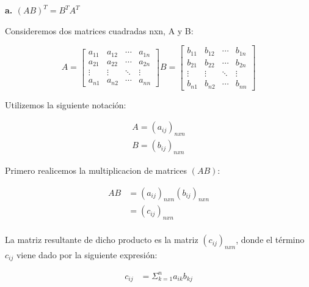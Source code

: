 
\renewcommand{\theenumi}{\alph{enumi}} %


\textbf{ a. $ (AB)^{T} = B^{T} A^{T}  $}

\vspace*{0.5 cm}

Consideremos dos matrices cuadradas nxn, A y B:

\begin{equation*}
    A= \begin{bmatrix}
        a_{11} & a_{12} & \cdots & a_{1n} \\
        a_{21} & a_{22} & \cdots & a_{2n} \\
        \vdots & \vdots & \ddots & \vdots \\
        a_{n1} & a_{n2} & \cdots & a_{nn}
    \end{bmatrix}
    B= \begin{bmatrix}
        b_{11} & b_{12} & \cdots & b_{1n} \\
        b_{21} & b_{22} & \cdots & b_{2n} \\
        \vdots & \vdots & \ddots & \vdots \\
        b_{n1} & b_{n2} & \cdots & b_{nn}
    \end{bmatrix}
\end{equation*}

\vspace*{0.15cm}

Utilizemos la siguiente notación:

\begin{gather*}
    A= (a_{ij})_{nxn} \\
    B=(b_{ij})_{nxn}
\end{gather*}

Primero realicemos la multiplicacion de matrices $ \left( AB \right) $:

\begin{align*}
    AB & = (a_{ij})_{nxn} (b_{ij})_{nxn} \\
       & = \left( c_{ij} \right)_{nxn}   \\
\end{align*}

La matriz resultante de dicho producto es la matriz $ \left( c_{ij} \right)_{nxn} $, donde
el término $c_{ij}$ viene dado por la siguiente expresión:

\begin{align*}
    c_{ij} & = \Sigma_{k=1}^{n} a_{ik} b_{kj}
\end{align*}


